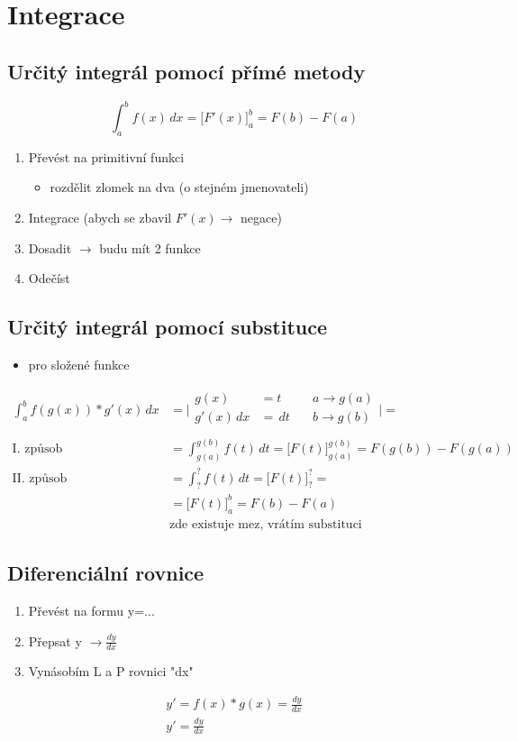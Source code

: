 \section{Integrace}
\subsection{Určitý integrál pomocí přímé metody}
\begin{equation}
\int_{a}^{b}f(x)\,dx = \Bigr[ F'(x) \Bigr]_a^b=F(b)-F(a)
\end{equation}

\begin{enumerate}
  \item Převést na primitivní funkci
    \begin{itemize}
      \item rozdělit zlomek na dva (o stejném jmenovateli)
    \end{itemize}
  \item Integrace (abych se zbavil $F'(x)\rightarrow$ negace)
  \item Dosadit $\rightarrow$ budu mít 2 funkce
  \item Odečíst
\end{enumerate}

\subsection{Určitý integrál pomocí substituce}
\begin{itemize}\item pro složené funkce\end{itemize}
\begin{align*}
  \int_a^bf(g(x))*g'(x)\,dx&=
  \Biggr|
    \begin{alignedat}{2}
      g(x) &=t \quad &a \rightarrow g(a) \\
      g'(x)\,dx &=\,dt \quad &b \rightarrow g(b) \\
    \end{alignedat}
  \Biggr| = \\
  \text{I. způsob} &= \int_{g(a)}^{g(b)}f(t)\,dt = \Bigr[F(t)\Bigr]_{g(a)}^{g(b)} = F(g(b))-F(g(a)) \\
  \text{II. způsob} &= \int_?^?f(t)\,dt=\Bigr[F(t)\Bigr]_?^? = \\
  &=\Bigr[F(t)\Bigr]_a^b = F(b)-F(a) \\
  & \text{zde existuje mez, vrátím substituci}
\end{align*}

\subsection{Diferenciální rovnice}
\begin{enumerate}
  \item Převést na formu y=...
  \item Přepsat y $\rightarrow\frac{dy}{dx}$
  \item Vynásobím L a P rovnici "dx"
\end{enumerate}

\begin{align*}
  y'=f(x)*g(x)=\frac{dy}{dx}\\
  y'=\frac{dy}{dx}\\
\end{align*}
